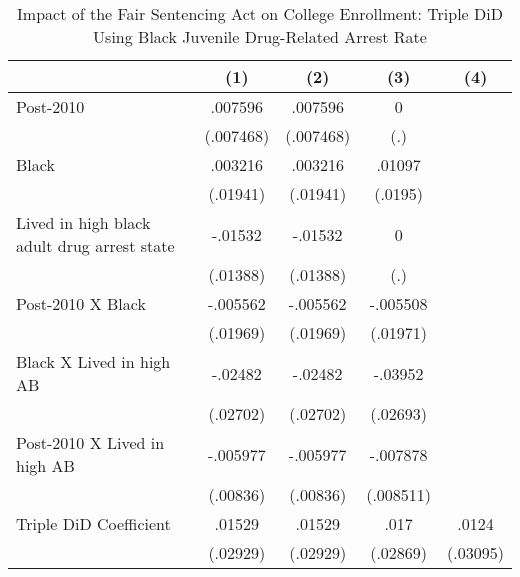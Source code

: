 \begin{table}[htbp]\centering
\def\sym#1{\ifmmode^{#1}\else\(^{#1}\)\fi}
\caption{Impact of the Fair Sentencing Act on College Enrollment: Triple DiD Using Black Juvenile Drug-Related Arrest Rate}
\begin{tabular}{l*{4}{c}}
\hline\hline
                    &\multicolumn{1}{c}{(1)}         &\multicolumn{1}{c}{(2)}         &\multicolumn{1}{c}{(3)}         &\multicolumn{1}{c}{(4)}         \\
\hline
Post-2010           &     .007596         &     .007596         &           0         &                     \\
                    &   (.007468)         &   (.007468)         &         (.)         &                     \\
[1em]
Black               &     .003216         &     .003216         &      .01097         &                     \\
                    &    (.01941)         &    (.01941)         &     (.0195)         &                     \\
[1em]
Lived in high black adult drug arrest state&     -.01532         &     -.01532         &           0         &                     \\
                    &    (.01388)         &    (.01388)         &         (.)         &                     \\
[1em]
Post-2010 X Black   &    -.005562         &    -.005562         &    -.005508         &                     \\
                    &    (.01969)         &    (.01969)         &    (.01971)         &                     \\
[1em]
Black X Lived in high AB&     -.02482         &     -.02482         &     -.03952         &                     \\
                    &    (.02702)         &    (.02702)         &    (.02693)         &                     \\
[1em]
Post-2010 X Lived in high AB&    -.005977         &    -.005977         &    -.007878         &                     \\
                    &    (.00836)         &    (.00836)         &   (.008511)         &                     \\
[1em]
Triple DiD Coefficient&      .01529         &      .01529         &        .017         &       .0124         \\
                    &    (.02929)         &    (.02929)         &    (.02869)         &    (.03095)         \\

\end{tabular}
\end{table}
